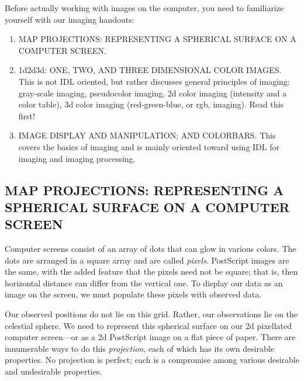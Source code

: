 \documentclass[psfig,preprint]{aastex}
\begin{document}
Before actually working with images on the computer, you need to
familiarize yourself with our imaging handouts:
\begin{enumerate}

\item MAP PROJECTIONS: REPRESENTING A SPHERICAL SURFACE ON A COMPUTER
  SCREEN.

\item 1d2d3d: ONE, TWO, AND THREE DIMENSIONAL COLOR IMAGES. This
is not IDL oriented, but rather discusses general principles of imaging:
gray-scale imaging, pseudocolor imaging, 2d color imaging (intensity
and a color table), 3d color imaging (red-green-blue, or rgb,
imaging). Read this first!

\item IMAGE DISPLAY AND MANIPULATION; AND COLORBARS. This covers
  the basics of imaging and is mainly oriented toward using IDL for
  imaging and imaging processing.
\end{enumerate}

\subsection{MAP PROJECTIONS: REPRESENTING A SPHERICAL SURFACE ON A COMPUTER SCREEN}

Computer screens consist of an array of dots that can glow in various
colors. The dots are arranged in a square array and are called {\it
  pixels}. PostScript images are the same, with the added feature that
the pixels need not be square; that is, then horizontal distance can
differ from the vertical one. To display our data as an image on the
screen, we must populate these pixels with observed data. 

Our observed positions do not lie on this grid. Rather, our observations
lie on the celestial sphere. We need to represent this spherical surface
on our 2d pixellated computer screen---or as a 2d PostScript image on
a flat piece of paper. There are innumerable ways to do this
{\it projection}, each of which has its own
desirable properties. No projection is perfect; each is a compromise 
among various desirable and undesirable properties. 
\end{document}
